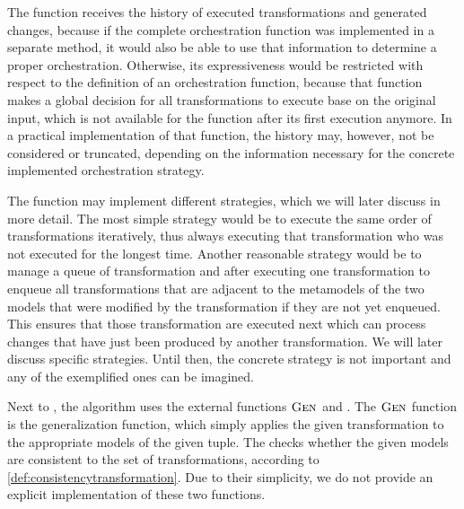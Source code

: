 The function receives the history of executed transformations and generated changes, because if the complete orchestration function was implemented in a separate method, it would also be able to use that information to determine a proper orchestration.
Otherwise, its expressiveness would be restricted with respect to the definition of an orchestration function, because that function makes a global decision for all transformations to execute base on the original input, which is not available for the  function after its first execution anymore.
In a practical implementation of that function, the history may, however, not be considered or truncated, depending on the information necessary for the concrete implemented orchestration strategy.

The  function may implement different strategies, which we will later discuss in more detail.
The most simple strategy would be to execute the same order of transformations iteratively, thus always executing that transformation who was not executed for the longest time.
Another reasonable strategy would be to manage a queue of transformation and after executing one transformation to enqueue all transformations that are adjacent to the metamodels of the two models that were modified by the transformation if they are not yet enqueued.
This ensures that those transformation are executed next which can process changes that have just been produced by another transformation.
We will later discuss specific strategies.
Until then, the concrete strategy is not important and any of the exemplified ones can be imagined.

Next to , the algorithm uses the external functions $\textsc{Gen}_{}$ and .
The $\textsc{Gen}_{}$ function is the generalization function, which simply applies the given transformation to the appropriate models of the given tuple.
The  checks whether the given models are consistent to the set of transformations, according to \autoref{def:consistencytransformation}.
Due to their simplicity, we do not provide an explicit implementation of these two functions.


